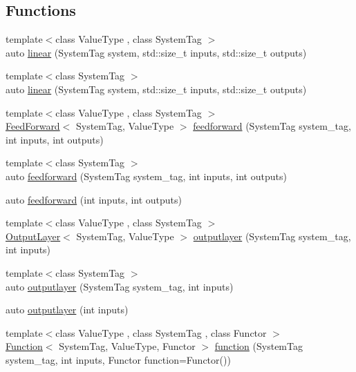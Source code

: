 \subsection*{Functions}
\begin{DoxyCompactItemize}
\item 
{\footnotesize template$<$class Value\+Type , class System\+Tag $>$ }\\auto \hyperlink{namespaceBC_1_1nn_a38965a760aed98536d8a3930eeadee48}{linear} (System\+Tag system, std\+::size\+\_\+t inputs, std\+::size\+\_\+t outputs)
\item 
{\footnotesize template$<$class System\+Tag $>$ }\\auto \hyperlink{namespaceBC_1_1nn_a4f8ca60b8d5eb4f4bc1046a059f3ea0c}{linear} (System\+Tag system, std\+::size\+\_\+t inputs, std\+::size\+\_\+t outputs)
\item 
{\footnotesize template$<$class Value\+Type , class System\+Tag $>$ }\\\hyperlink{classBC_1_1nn_1_1FeedForward}{Feed\+Forward}$<$ System\+Tag, Value\+Type $>$ \hyperlink{namespaceBC_1_1nn_a51fc70cd8778330bc4914e542c48b155}{feedforward} (System\+Tag system\+\_\+tag, int inputs, int outputs)
\item 
{\footnotesize template$<$class System\+Tag $>$ }\\auto \hyperlink{namespaceBC_1_1nn_a948b06010c609f3f11ace46c5651193f}{feedforward} (System\+Tag system\+\_\+tag, int inputs, int outputs)
\item 
auto \hyperlink{namespaceBC_1_1nn_a1dde2f1cb0e9e565993fded0847fb556}{feedforward} (int inputs, int outputs)
\item 
{\footnotesize template$<$class Value\+Type , class System\+Tag $>$ }\\\hyperlink{structBC_1_1nn_1_1OutputLayer}{Output\+Layer}$<$ System\+Tag, Value\+Type $>$ \hyperlink{namespaceBC_1_1nn_a39c999166064e9ab5d1a89d2c717dc6e}{outputlayer} (System\+Tag system\+\_\+tag, int inputs)
\item 
{\footnotesize template$<$class System\+Tag $>$ }\\auto \hyperlink{namespaceBC_1_1nn_a2f30c07bc3c1f4cdee774731040c1daa}{outputlayer} (System\+Tag system\+\_\+tag, int inputs)
\item 
auto \hyperlink{namespaceBC_1_1nn_a05306f12db2fce53d32b8b3b5b1357ce}{outputlayer} (int inputs)
\item 
{\footnotesize template$<$class Value\+Type , class System\+Tag , class Functor $>$ }\\\hyperlink{classBC_1_1nn_1_1Function}{Function}$<$ System\+Tag, Value\+Type, Functor $>$ \hyperlink{namespaceBC_1_1nn_a5429ceaa392776ade7234175af39050d}{function} (System\+Tag system\+\_\+tag, int inputs, Functor function=Functor())

\end{DoxyCompactItemize}
